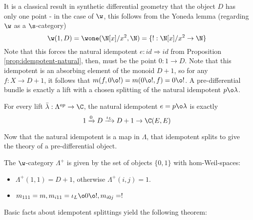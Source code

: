 It is a classical result in synthetic differential geometry that the object $D$ has only one point - in the case of $\w$, this follows from the Yoneda lemma (regarding $\w$ as a $\s$-category)
\[
	\w(1,D) = \wone(\N[x]/x^2, \N) = \{ !: \N[x]/x^2 \to \N \}
\]
Note that this forces the natural idempotent $e:id \Rightarrow id$ from Proposition \ref{prop:idempotent-natural}, then, must be the point $0:1 \to D$. Note that this idempotent is an absorbing element of the monoid $D+1$, so for any $f:X \to D+1$, it follows that $m(f,0\o !) = m(0\o !, f) = 0\o !$.  A pre-differential bundle is exactly a lift with a chosen splitting of the natural idempotent $p\o\lambda$.
\begin{lemma}%
	\label{lem:splitting-of-idemp-is-lambdaplus}
	For every lift $\bar{\lambda}:\Lambda^{op} \to \C$, the natural idempotent $e = p \o \lambda$ is exactly
	\[1 \xrightarrow[]{0} D \xrightarrow[]{\iota_L} D+1 \to \C(E,E)\]
\end{lemma}
Now that the natural idempotent is a map in $\Lambda$, that idempotent splits to give the theory of a pre-differential object.
\begin{definition}%
	\label{def:lambda-plus}
	The $\w$-category $\Lambda^+$ is given by the set of objects $\{0,1\}$ with hom-Weil-spaces:
	\begin{itemize}
		\item $\Lambda^+(1,1) = D+1$, otherwise $\Lambda^+(i,j) = 1$.
		\item $m_{111} = m, m_{i11} = \iota_L \o 0 \o !, m_{i0j} = !$
	\end{itemize}
\end{definition}
Basic facts about idempotent splittings yield the following theorem:
